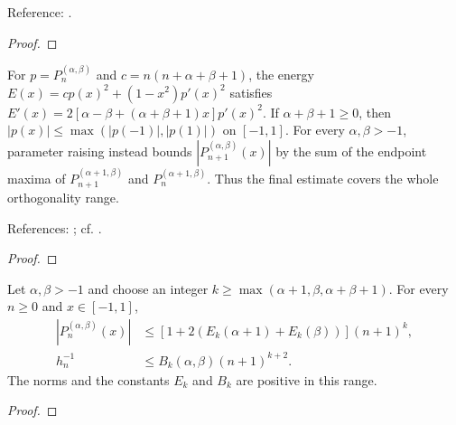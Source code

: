 \begin{supporting}
\begin{theorem}
Reference: \cite[5.5.1, 5.6]{dlmf}.
\end{theorem}
\begin{proof}
\leanok
\end{proof}

\begin{theorem}
\label{thm:jacobi-sonin-bound}
\leanok
For $p=P_n^{(\alpha,\beta)}$ and $c=n(n+\alpha+\beta+1)$, the energy
$E(x)=cp(x)^2+(1-x^2)p'(x)^2$ satisfies
$E'(x)=2[\alpha-\beta+(\alpha+\beta+1)x]p'(x)^2$.
If $\alpha+\beta+1\ge0$, then
$|p(x)|\le\max(|p(-1)|,|p(1)|)$ on $[-1,1]$.
For every $\alpha,\beta>-1$, parameter raising instead bounds
$|P_{n+1}^{(\alpha,\beta)}(x)|$ by the sum of the endpoint maxima of
$P_{n+1}^{(\alpha+1,\beta)}$ and $P_n^{(\alpha+1,\beta)}$.
Thus the final estimate covers the whole orthogonality range.

References: \cite[Table 18.8.1 and 18.9(ii)]{dlmf}; cf. \cite[18.14(i)]{dlmf}.
\end{theorem}
\begin{proof}
\leanok
\end{proof}

\begin{theorem}
\label{thm:jacobi-polynomial-growth}
\leanok
Let $\alpha,\beta>-1$ and choose an integer
$k\ge\max(\alpha+1,\beta,\alpha+\beta+1)$. For every $n\ge0$ and $x\in[-1,1]$,
\begin{align*}
 |P_n^{(\alpha,\beta)}(x)|
 &\le[1+2(E_k(\alpha+1)+E_k(\beta))](n+1)^k,\\
 h_n^{-1}&\le B_k(\alpha,\beta)(n+1)^{k+2}.
\end{align*}
The norms and the constants $E_k$ and $B_k$ are positive in this range.
\end{theorem}
\begin{proof}
\leanok
\end{proof}


\end{supporting}
